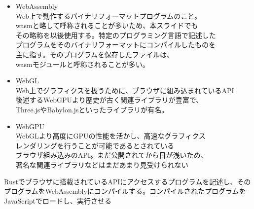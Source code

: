 \begin{itemize}
	\item WebAssembly\\Web上で動作するバイナリフォーマットプログラムのこと。\\wasmと略して呼称されることが多いため、本スライドでも\\その略称を以後使用する。特定のプログラミング言語で記述した\\プログラムをそのバイナリフォーマットにコンパイルしたものを\\主に指す。そのプログラムを保存したファイルは、\\wasmモジュールと呼称されることが多い。
	\newpage
	
	\item WebGL\\Web上でグラフィクスを扱うために、ブラウザに組み込まれているAPI\\後述するWebGPUより歴史が古く関連ライブラリが豊富で、\\Three.jsやBabylon.jsといったライブラリが有名。
	
	\item WebGPU\\WebGLより高度にGPUの性能を活かし、高速なグラフィクス\\レンダリングを行うことが可能であるとされている\\ブラウザ組み込みのAPI。まだ公開されてから日が浅いため、\\著名な関連ライブラリなどはまだあまり見受けられない
\end{itemize}

Rustでブラウザに搭載されているAPIにアクセスするプログラムを記述し、そのプログラムをWebAssemblyにコンパイルする。コンパイルされたプログラムをJavaScriptでロードし、実行させる

\newpage

